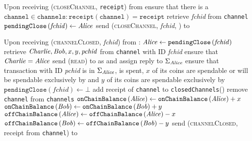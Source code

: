 \begin{functionality}{\fpaynet}
\begin{algorithmic}[1]
    \State Upon receiving (\textsc{closeChannel}, \texttt{receipt}) from \alice
     
    \Indent
      \State ensure that there is a $\mathtt{channel} \in \mathtt{channels} :
      \mathtt{receipt}\left(\mathtt{channel}\right) = \mathtt{receipt}$
      \State retrieve \textit{fchid} from \texttt{channel}
      \State $\mathtt{pendingClose}\left(\mathit{fchid}\right) \gets \mathit{Alice}$
      \State send (\textsc{closeChannel}, \textit{fchid}, \alice) to \simulator
    \EndIndent
    \State

    \State Upon receiving (\textsc{channelClosed}, \textit{fchid}) from
    \simulator:
    \Indent
      \State $\mathit{Alice} \gets \mathtt{pendingClose}\left(\mathit{fchid}\right)$
      \State retrieve $\mathit{Charlie}, \mathit{Bob}, x, y, \mathit{pchid}$ from
      \texttt{channel} with ID \textit{fchid}
      \State ensure that $\mathit{Charlie}{} = \mathit{Alice}$
      \State send (\textsc{read}) to \ledger{} as \alice{} and assign reply to
      $\Sigma_{\mathit{Alice}}$
      \State ensure that transaction with ID \textit{pchid} is in
      $\Sigma_{\mathit{Alice}}$, is spent, $x$ of its coins are spendable or
      will be spendable exclusively by \alice{} and $y$ of its coins are
      spendable exclusively by \bob
      \State $\mathtt{pendingClose}\left(\mathit{fchid}\right) \gets \bot$
      \State add receipt of \texttt{channel} to \texttt{closedChannels}(\bob)
      \State remove \texttt{channel} from \texttt{channels}
      \State $\mathtt{onChainBalance}\left(\mathit{Alice}\right) \gets
      \mathtt{onChainBalance}\left(\mathit{Alice}\right) + x$
      \State $\mathtt{onChainBalance}\left(\mathit{Bob}\right) \gets
      \mathtt{onChainBalance}\left(\mathit{Bob}\right) + y$
      \State $\mathtt{offChainBalance}\left(\mathit{Alice}\right) \gets
      \mathtt{offChainBalance}\left(\mathit{Alice}\right) - x$
      \State $\mathtt{offChainBalance}\left(\mathit{Bob}\right) \gets
      \mathtt{offChainBalance}\left(\mathit{Bob}\right) - y$
      \State send (\textsc{channelClosed}, receipt from \texttt{channel}) to
      \alice
    \EndIndent
    \State


\end{algorithmic}
\end{functionality}
